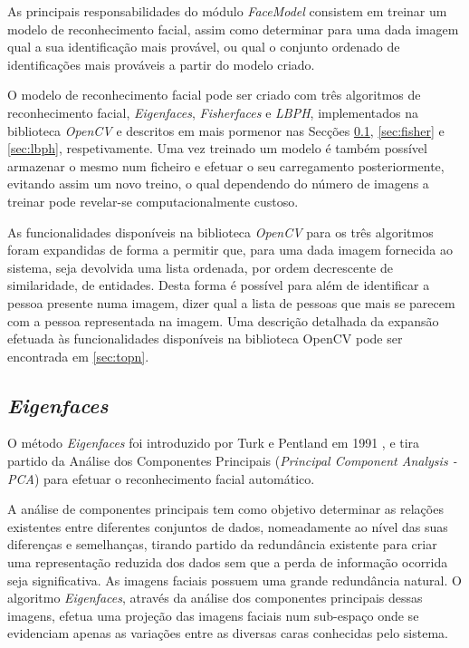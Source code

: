As principais responsabilidades do módulo \textit{FaceModel} consistem em treinar um modelo de reconhecimento facial, assim como determinar para uma dada imagem qual a sua identificação mais provável, ou qual o conjunto ordenado de identificações mais prováveis a partir do modelo criado.

O modelo de reconhecimento facial pode ser criado com três algoritmos de reconhecimento facial, \textit{Eigenfaces}, \textit{Fisherfaces} e \textit{LBPH}, implementados na biblioteca \textit{OpenCV} e descritos em mais pormenor nas Secções \ref{sec:eigen}, \ref{sec:fisher} e \ref{sec:lbph}, respetivamente. Uma vez treinado um modelo é também possível armazenar o mesmo num ficheiro e efetuar o seu carregamento posteriormente, evitando assim um novo treino, o qual dependendo do número de imagens a treinar pode revelar-se computacionalmente custoso.

As funcionalidades disponíveis na biblioteca \textit{OpenCV} para os três algoritmos foram expandidas de forma a permitir que, para uma dada imagem fornecida ao sistema, seja devolvida uma lista ordenada, por ordem decrescente de similaridade, de entidades. Desta forma é possível para além de identificar a pessoa presente numa imagem, dizer qual a lista de pessoas que mais se parecem com a pessoa representada na imagem. Uma descrição detalhada da expansão efetuada às funcionalidades disponíveis na biblioteca OpenCV pode ser encontrada em \ref{sec:topn}.

\subsection{\textit{Eigenfaces}} \label{sec:eigen}
O método \textit{Eigenfaces} foi introduzido por Turk e Pentland em 1991 \cite{Turk1991}, e tira partido da Análise dos Componentes Principais (\textit{Principal Component Analysis - PCA}) para efetuar o reconhecimento facial automático.

A análise de componentes principais tem como objetivo determinar as relações existentes entre diferentes conjuntos de dados, nomeadamente ao nível das suas diferenças e semelhanças, tirando partido da redundância existente para criar uma representação reduzida dos dados sem que a perda de informação ocorrida seja significativa. As imagens faciais possuem uma grande redundância natural. O algoritmo \textit{Eigenfaces}, através da análise dos componentes principais dessas imagens, efetua uma projeção das imagens faciais num sub-espaço onde se evidenciam apenas as variações entre as diversas caras conhecidas pelo sistema.

